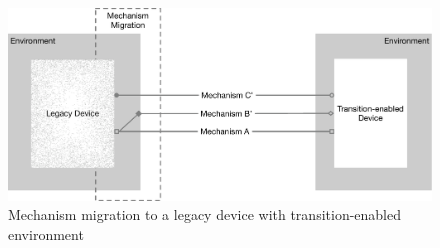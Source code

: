 






\begin{figure}
    \centering
    \includegraphics[width=.8\linewidth]{figures/MechanismMigration.pdf}
    \caption{Mechanism migration to a legacy device with transition-enabled environment}
    \label{fig:bigpicture}
\end{figure}

